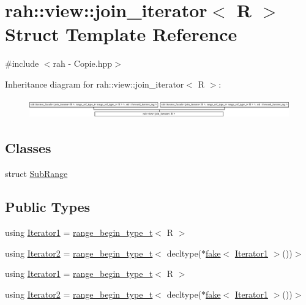 \hypertarget{structrah_1_1view_1_1join__iterator}{}\section{rah\+::view\+::join\+\_\+iterator$<$ R $>$ Struct Template Reference}
\label{structrah_1_1view_1_1join__iterator}


{\ttfamily \#include $<$rah -\/ Copie.\+hpp$>$}

Inheritance diagram for rah\+::view\+::join\+\_\+iterator$<$ R $>$\+:\begin{figure}[H]
\begin{center}
\leavevmode
\includegraphics[height=0.843373cm]{structrah_1_1view_1_1join__iterator}
\end{center}
\end{figure}
\subsection*{Classes}
\begin{DoxyCompactItemize}
\item 
struct \mbox{\hyperlink{structrah_1_1view_1_1join__iterator_1_1_sub_range}{Sub\+Range}}
\end{DoxyCompactItemize}
\subsection*{Public Types}
\begin{DoxyCompactItemize}
\item 
using \mbox{\hyperlink{structrah_1_1view_1_1join__iterator_a8b71c6f25eee2915e2a8afc6e024196d}{Iterator1}} = \mbox{\hyperlink{namespacerah_a28aff4eeddcece6be65ff0b956d32d4a}{range\+\_\+begin\+\_\+type\+\_\+t}}$<$ R $>$
\item 
using \mbox{\hyperlink{structrah_1_1view_1_1join__iterator_ae03a066174f3422c70d0e3c22e68d9f7}{Iterator2}} = \mbox{\hyperlink{namespacerah_a28aff4eeddcece6be65ff0b956d32d4a}{range\+\_\+begin\+\_\+type\+\_\+t}}$<$ decltype($\ast$\mbox{\hyperlink{namespacerah_aa659f5ae02cb923cd8813f96cfd86a25}{fake}}$<$ \mbox{\hyperlink{structrah_1_1view_1_1join__iterator_a8b71c6f25eee2915e2a8afc6e024196d}{Iterator1}} $>$())$>$
\item 
using \mbox{\hyperlink{structrah_1_1view_1_1join__iterator_a8b71c6f25eee2915e2a8afc6e024196d}{Iterator1}} = \mbox{\hyperlink{namespacerah_a28aff4eeddcece6be65ff0b956d32d4a}{range\+\_\+begin\+\_\+type\+\_\+t}}$<$ R $>$
\item 
using \mbox{\hyperlink{structrah_1_1view_1_1join__iterator_ae03a066174f3422c70d0e3c22e68d9f7}{Iterator2}} = \mbox{\hyperlink{namespacerah_a28aff4eeddcece6be65ff0b956d32d4a}{range\+\_\+begin\+\_\+type\+\_\+t}}$<$ decltype($\ast$\mbox{\hyperlink{namespacerah_aa659f5ae02cb923cd8813f96cfd86a25}{fake}}$<$ \mbox{\hyperlink{structrah_1_1view_1_1join__iterator_a8b71c6f25eee2915e2a8afc6e024196d}{Iterator1}} $>$())$>$
\end{DoxyCompactItemize}
